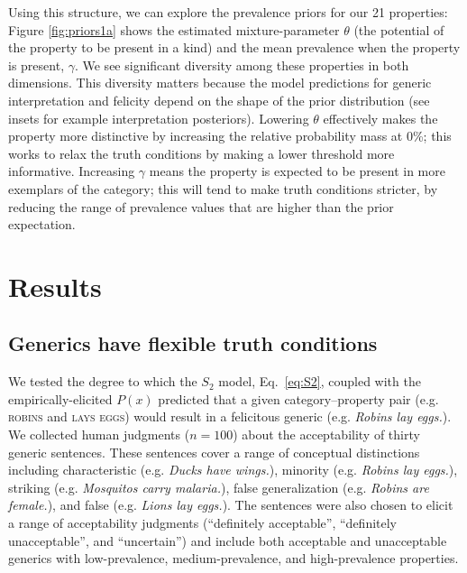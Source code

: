 \documentclass{pnastwo}
\begin{document}
\begin{article}
Using this structure, we can explore the prevalence priors for our 21 properties:
Figure \ref{fig:priors1a} shows the estimated mixture-parameter $\theta$ (the potential of the property to be present in a kind) and the mean prevalence when the property is present, $\gamma$. 
We see significant diversity among these properties in both dimensions. 
This diversity matters because the model predictions for generic interpretation and felicity depend on the shape of the prior distribution (see insets for example interpretation posteriors).
Lowering $\theta$ effectively makes the property more distinctive by increasing the relative probability mass at 0\%; this works to relax the truth conditions by making a lower threshold more informative.
Increasing $\gamma$ means the property is expected to be present in more exemplars of the category; this will tend to make truth conditions stricter, by reducing the range of prevalence values that are higher than the prior expectation. 


\section{Results}

\subsection{Generics have flexible truth conditions}
We tested the degree to which the $S_2$ model, Eq.~\ref{eq:S2}, coupled with the empirically-elicited $P(x)$ predicted that a given category--property pair (e.g. \textsc{robins} and \textsc{lays eggs}) would result in a felicitous generic (e.g. \emph{Robins lay eggs.}). 
We collected human judgments ($n=100$) about the acceptability of thirty generic sentences. 
These sentences cover a range of conceptual distinctions  \cite{Prasada2013} including characteristic (e.g. \emph{Ducks have wings.}), minority (e.g. \emph{Robins lay eggs.}), striking (e.g. \emph{Mosquitos carry malaria.}), false generalization (e.g. \emph{Robins are female.}), and false (e.g. \emph{Lions lay eggs.}).
The sentences were also chosen to elicit a range of acceptability judgments (``definitely acceptable'', ``definitely unacceptable'', and ``uncertain'') and include both acceptable and unacceptable generics with low-prevalence, medium-prevalence, and high-prevalence properties.
%


\end{article}
\end{document}
